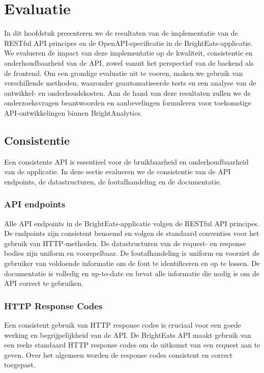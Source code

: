 \chapter{Evaluatie}
\label{ch:evaluatie}

In dit hoofdstuk presenteren we de resultaten van de implementatie van de RESTful API principes en de OpenAPI-specificatie in de Bright\-Eats-applicatie. We evalu\-eren de impact van deze implementatie op de kwaliteit, consistentie en onderhoudbaarheid van de API, zowel vanuit het perspectief van de backend als de frontend. Om een grondige evaluatie uit te voeren, maken we gebruik van verschillende methoden, waaronder geautomatiseerde tests en een analyse van de ontwikkel- en onderhoudskosten. Aan de hand van deze resultaten zullen we de onderzoeksvragen beantwoorden en aanbevelingen formuleren voor toekomstige API-ontwikkelingen binnen BrightAnalytics.

\section{Consistentie}

Een consistente API is essentieel voor de bruikbaarheid en onderhoudbaarheid van de applicatie. In deze sectie evalu\-eren we de consistentie van de API endpoints, de datastructuren, de foutafhandeling en de documentatie.

\subsection{API endpoints}

Alle API endpoints in de Bright\-Eats-applicatie volgen de RESTful API principes. De endpoints zijn consistent benoemd en volgen de standaard conventies voor het gebruik van HTTP-methoden. De datastructuren van de request- en response bodies zijn uniform en voorspelbaar. De foutafhandeling is uniform en voorziet de gebruiker van voldoende informatie om de fout te identificeren en op te lossen. De documentatie is volledig en up-to-date en bevat alle informatie die nodig is om de API correct te gebruiken.

\subsection{HTTP Response Codes}

Een consistent gebruik van HTTP response codes is cruciaal voor een goede werking en begrijpelijkheid van de API. De Bright\-Eats API maakt gebruik van een reeks standaard HTTP response codes om de uitkomst van een request aan te geven. Over het algemeen worden de response codes consistent en correct toegepast.


